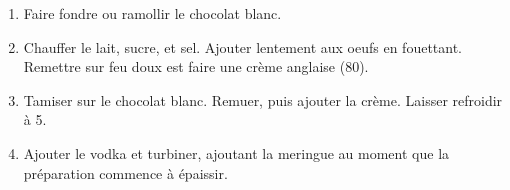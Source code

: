

\begin{ingredients}
\end{ingredients}


\begin{recipe}
  \begin{enumerate}

  \item Faire fondre ou ramollir le chocolat blanc.
    
  \item Chauffer le lait, sucre, et sel.  Ajouter lentement aux oeufs
    en fouettant.  Remettre sur feu doux est faire une crème anglaise
    (80\degreeC).

  \item Tamiser sur le chocolat blanc.  Remuer, puis ajouter la crème.
    Laisser refroidir à 5\degreeC.
    
  \item Ajouter le vodka et turbiner, ajoutant la meringue au moment
    que la préparation commence à épaissir.

  \end{enumerate}
\end{recipe}

